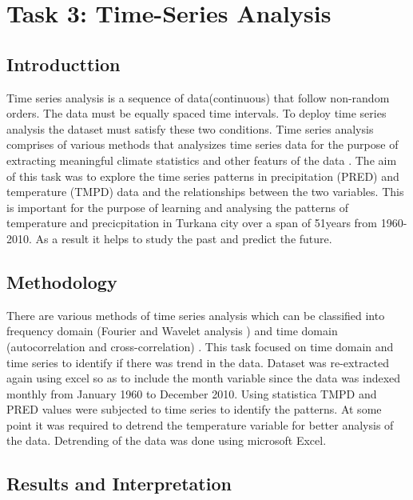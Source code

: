\documentclass[12pt,a4paper]{article}
\begin{document}
\newpage
\section{Task 3: Time-Series Analysis }
\subsection{Introducttion}
Time series analysis is a sequence of data(continuous) that follow non-random orders. The data must be equally spaced time intervals. To deploy time series analysis the dataset must satisfy these two conditions. Time series analysis comprises of various methods that analysizes time series data for the purpose of extracting meaningful climate statistics and other featurs of the data \cite{hamilton1994time}. The aim of this task was to explore the time series patterns in precipitation (PRED) and temperature (TMPD) data and the relationships between the two variables. This is important for the purpose of learning and analysing the patterns of temperature and precicpitation in Turkana city over a span of 51years from 1960-2010. As a result it helps to study the past and predict the future.

\subsection{Methodology}
There are various methods of time series analysis which can be classified into frequency domain (Fourier and Wavelet analysis ) and time domain (autocorrelation and cross-correlation) \cite{hamilton1994time}. This task focused on time domain and time series to identify if there was trend in the data. Dataset was re-extracted again using excel so as to include the month variable since the data was indexed monthly from January 1960 to December 2010. Using statistica TMPD and PRED values were subjected to time series to identify the patterns. At some point it was required to detrend the temperature variable for better analysis of the data. Detrending of the data was done using microsoft Excel.
\subsection{Results and Interpretation}
\end{document}
